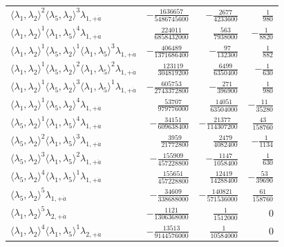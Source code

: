 \begin{longtable}{@{}lrrr@{}}
$\langle\lambda_1,\lambda_2\rangle^{2}\langle\lambda_5,\lambda_2\rangle^{3}\lambda_{1,+\dot a}$ & $-\frac{1636657}{5486745600}$ & $-\frac{2677}{4233600}$ & $\frac{1}{980}$ \\
$\langle\lambda_1,\lambda_2\rangle^{1}\langle\lambda_1,\lambda_5\rangle^{4}\lambda_{1,+\dot a}$ & $\frac{224011}{6858432000}$ & $\frac{563}{7938000}$ & $-\frac{1}{8820}$ \\
$\langle\lambda_1,\lambda_2\rangle^{1}\langle\lambda_5,\lambda_2\rangle^{1}\langle\lambda_1,\lambda_5\rangle^{3}\lambda_{1,+\dot a}$ & $-\frac{406489}{1371686400}$ & $-\frac{97}{132300}$ & $\frac{1}{882}$ \\
$\langle\lambda_1,\lambda_2\rangle^{1}\langle\lambda_5,\lambda_2\rangle^{2}\langle\lambda_1,\lambda_5\rangle^{2}\lambda_{1,+\dot a}$ & $\frac{123119}{304819200}$ & $\frac{6499}{6350400}$ & $-\frac{1}{630}$ \\
$\langle\lambda_1,\lambda_2\rangle^{1}\langle\lambda_5,\lambda_2\rangle^{3}\langle\lambda_1,\lambda_5\rangle^{1}\lambda_{1,+\dot a}$ & $-\frac{605753}{2743372800}$ & $-\frac{271}{396900}$ & $\frac{1}{980}$ \\
$\langle\lambda_1,\lambda_2\rangle^{1}\langle\lambda_5,\lambda_2\rangle^{4}\lambda_{1,+\dot a}$ & $\frac{53707}{979776000}$ & $\frac{14051}{63504000}$ & $-\frac{11}{35280}$ \\
$\langle\lambda_5,\lambda_2\rangle^{1}\langle\lambda_1,\lambda_5\rangle^{4}\lambda_{1,+\dot a}$ & $-\frac{34151}{609638400}$ & $-\frac{21377}{114307200}$ & $\frac{43}{158760}$ \\
$\langle\lambda_5,\lambda_2\rangle^{2}\langle\lambda_1,\lambda_5\rangle^{3}\lambda_{1,+\dot a}$ & $\frac{3959}{21772800}$ & $\frac{2479}{4082400}$ & $-\frac{1}{1134}$ \\
$\langle\lambda_5,\lambda_2\rangle^{3}\langle\lambda_1,\lambda_5\rangle^{2}\lambda_{1,+\dot a}$ & $-\frac{155909}{457228800}$ & $-\frac{1147}{1058400}$ & $\frac{1}{630}$ \\
$\langle\lambda_5,\lambda_2\rangle^{4}\langle\lambda_1,\lambda_5\rangle^{1}\lambda_{1,+\dot a}$ & $\frac{155651}{457228800}$ & $\frac{12419}{14288400}$ & $-\frac{53}{39690}$ \\
$\langle\lambda_5,\lambda_2\rangle^{5}\lambda_{1,+\dot a}$ & $-\frac{34609}{338688000}$ & $-\frac{140821}{571536000}$ & $\frac{61}{158760}$ \\
$\langle\lambda_1,\lambda_2\rangle^{5}\lambda_{2,+\dot a}$ & $-\frac{1121}{1306368000}$ & $\frac{1}{1512000}$ & $0$ \\
$\langle\lambda_1,\lambda_2\rangle^{4}\langle\lambda_1,\lambda_5\rangle^{1}\lambda_{2,+\dot a}$ & $-\frac{13513}{9144576000}$ & $\frac{1}{10584000}$ & $0$ \\

\end{longtable}
